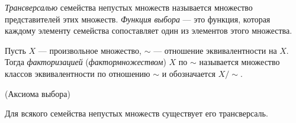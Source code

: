 \begin{definition}
	\textit{Трансверсалью} семейства непустых множеств называется множество представителей
	этих множеств. \textit{Функция выбора} --- это функция, которая каждому
	элементу семейства сопоставляет один из элементов этого множества.
\end{definition}

\begin{remark}
	Пусть $X$ --- произвольное множество, $\sim$ --- отношение эквивалентности на $X$.
	Тогда \textit{факторизацией} (\textit{фактормножеством}) $X$ по $\sim$ 
	называется множество классов эквивалентности по отношению $\sim$ и 
	обозначается $X / \sim$.
\end{remark}

\begin{definition}(Аксиома выбора)

	Для всякого семейства непустых множеств существует его трансверсаль.
\end{definition}

